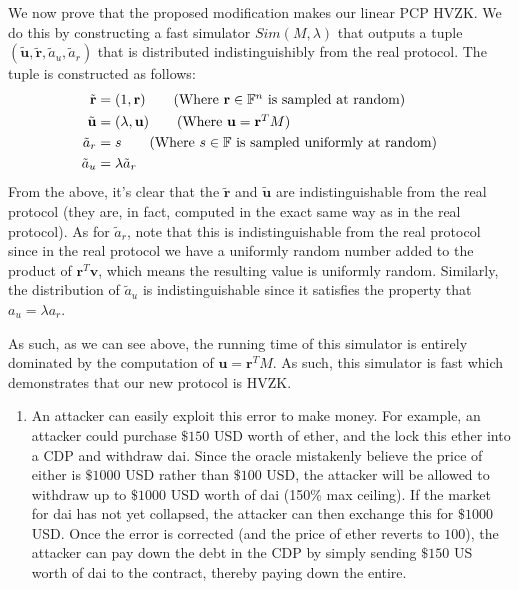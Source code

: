 \documentclass[12pt]{exam}
\newcommand{\Q}[1]{\question{\large{\textbf{#1}}}}
\begin{document}
\begin{questions}
\begin{solution}
\begin{enumerate}[label=\textbf{\alph*.}]
\begin{itemize}
      We now prove that the proposed modification makes our linear PCP HVZK. We do this by constructing a fast simulator $\textit{Sim}(M, \lambda)$ that outputs a tuple $(\tilde{\textbf{u}}, \tilde{\textbf{r}}, \tilde{a}_u, \tilde{a}_r)$ that is distributed indistinguishibly from the real protocol. The tuple is constructed as follows:
      \begin{align*}
        \tilde{\textbf{r}} &= (1, \textbf{r}) \tag{Where $\textbf{r} \in \mathbb{F}^n$ is sampled at random} \\
        \tilde{\textbf{u}} &= (\lambda, \textbf{u}) \tag{Where $\textbf{u} = \textbf{r}^TM$} \\
        \tilde{a}_r &= s \tag{Where $s \in \mathbb{F}$ is sampled uniformly at random} \\
        \tilde{a}_u &= \lambda \tilde{a}_r 
      \end{align*}
      From the above, it's clear that the $\tilde{\textbf{r}}$ and $\tilde{\textbf{u}}$ are indistinguishable from the real protocol (they are, in fact, computed in the exact same way as in the real protocol). As for $\tilde{a}_r$, note that this is indistinguishable from the real protocol since in the real protocol we have a uniformly random number added to the product of $\textbf{r}^T\textbf{v}$, which means the resulting value is uniformly random. Similarly, the distribution of $\tilde{a}_u$ is indistinguishable since it satisfies the property that $a_u = \lambda a_r$.

      As such, as we can see above, the running time of this simulator is entirely dominated by the computation of $\textbf{u} = \textbf{r}^T M$. As such, this simulator is fast which demonstrates that our new protocol is HVZK.
    \end{itemize}
  \end{enumerate}
\end{solution}


\newpage
\Q{Problem 5}
\begin{solution}
\begin{enumerate}[label=\textbf{\alph*.}]
  \item An attacker can easily exploit this error to make money. For example, an attacker could purchase $\$150$ USD worth of ether, and the lock this ether into a CDP and withdraw dai. Since the oracle mistakenly believe the price of either is $\$1000$ USD rather than $\$100$ USD, the attacker will be allowed to withdraw up to $\$ 1000$ USD worth of dai (150\% max ceiling). If the market for dai has not yet collapsed, the attacker can then exchange this for $\$1000$ USD. Once the error is corrected (and the price of ether reverts to $100$), the attacker can pay down the debt in the CDP by simply sending $\$150$ US worth of dai to the contract, thereby paying down the entire.


\end{enumerate}
\end{solution}
\end{questions}
\end{document}
